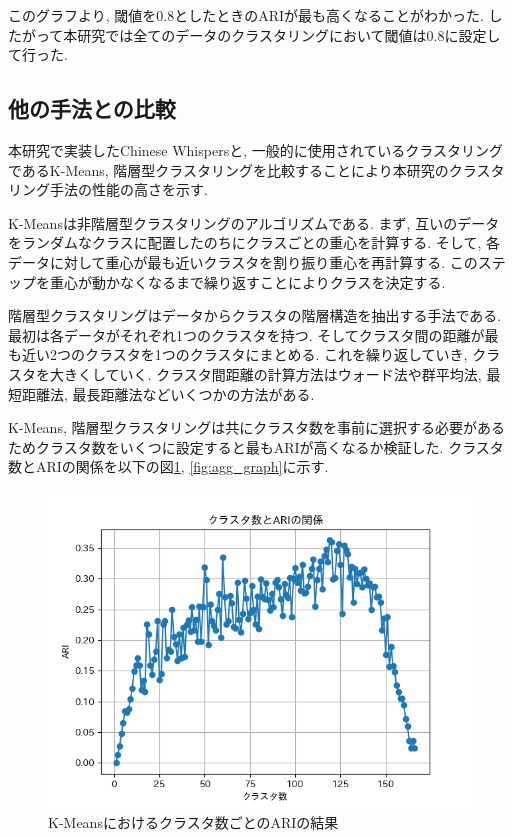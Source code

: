 このグラフより, 閾値を0.8としたときのARIが最も高くなることがわかった. したがって本研究では全てのデータのクラスタリングにおいて閾値は0.8に設定して行った. 

\subsection{他の手法との比較}
本研究で実装したChinese Whispersと, 一般的に使用されているクラスタリングであるK-Means, 階層型クラスタリングを比較することにより本研究のクラスタリング手法の性能の高さを示す. 

K-Meansは非階層型クラスタリングのアルゴリズムである. まず, 互いのデータをランダムなクラスに配置したのちにクラスごとの重心を計算する. そして, 各データに対して重心が最も近いクラスタを割り振り重心を再計算する. このステップを重心が動かなくなるまで繰り返すことによりクラスを決定する.

階層型クラスタリングはデータからクラスタの階層構造を抽出する手法である. 最初は各データがそれぞれ1つのクラスタを持つ. そしてクラスタ間の距離が最も近い2つのクラスタを1つのクラスタにまとめる. これを繰り返していき, クラスタを大きくしていく. クラスタ間距離の計算方法はウォード法や群平均法, 最短距離法, 最長距離法などいくつかの方法がある. 

K-Means, 階層型クラスタリングは共にクラスタ数を事前に選択する必要があるためクラスタ数をいくつに設定すると最もARIが高くなるか検証した. 
クラスタ数とARIの関係を以下の図\ref{fig:kmeans_graph}, \ref{fig:agg_graph}に示す.

\begin{figure}[hbtp]
  \centering
  \includegraphics[scale=0.8]
    {contents/images/kmeans_graph.png}
  \caption{K-Meansにおけるクラスタ数ごとのARIの結果\label{fig:kmeans_graph}}
\end{figure}

